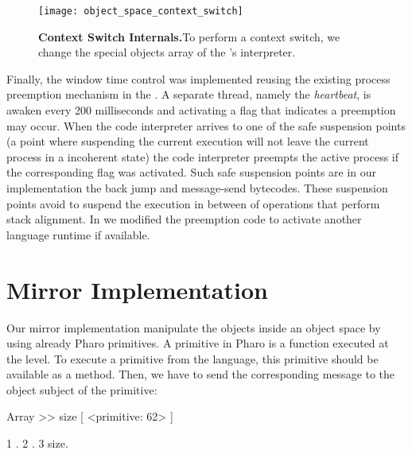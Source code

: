 \begin{figure*}[htb]
\begin{center}
\texttt{[image: object\_space\_context\_switch]}
\caption{\textbf{Context Switch Internals.}To perform a context switch, we change the special objects array of the \VM's interpreter.\label{fig:context_switch}}
\end{center}
\end{figure*}

Finally, the window time control was implemented reusing the existing process preemption mechanism in the \VM. A separate thread, namely the \emph{heartbeat}, is awaken every 200 milliseconds and activating a flag that indicates a preemption may occur. When the \VM code interpreter arrives to one of the safe suspension points (\ie a point where suspending the current execution will not leave the current process in a incoherent state) the code interpreter preempts the active process if the corresponding flag was activated. Such safe suspension points are in our implementation the back jump and message-send bytecodes. These suspension points avoid to suspend the execution in between of \eg operations that perform stack alignment. In \Vtt we modified the preemption code to activate another language runtime if available.

\section{Mirror Implementation}\label{sec:implementation_mirrors}

Our mirror implementation manipulate the objects inside an object space by using already Pharo \VM primitives. A primitive in Pharo is a function executed at the \VM level. To execute a primitive from the language, this primitive should be available as a method. Then, we have to send the corresponding message to the object subject of the primitive:

\begin{code}
Array >> size [
    <primitive: 62>
]

{1 . 2 . 3} size.
\end{code}

